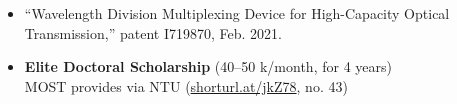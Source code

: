 



\begin{itemize}
\item {\normalsize ``Wavelength Division Multiplexing Device for High-Capacity Optical Transmission,'' patent I719870, Feb. 2021.}
\end{itemize}


\begin{itemize}
\item {\normalsize \textbf{\large Elite Doctoral Scholarship} (40--50 k/month, for 4 years)\\MOST provides via NTU 
                            (\href{https://shorturl.at/jkZ78}{shorturl.at/jkZ78}, no. 43)}
\end{itemize}

